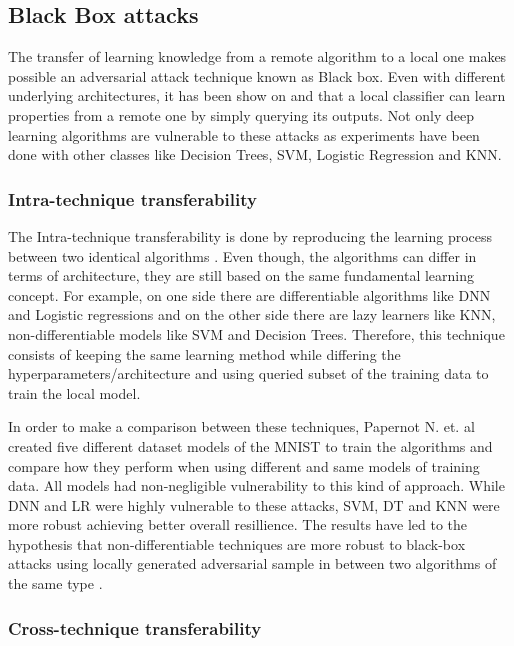 \documentclass{article}
\begin{document}
\subsection{Black Box attacks}\label{subsec:black_box}
 
The transfer of learning knowledge from a remote algorithm to a local one makes possible an adversarial attack technique known as Black box. Even with different underlying architectures, it has been show on \cite{papernot2016transf} and \cite{papernot2016} that a local classifier can learn properties from a remote one by simply querying its outputs. Not only deep learning algorithms are vulnerable to these attacks as experiments have been done with other classes like Decision Trees, SVM, Logistic Regression and KNN.


\subsubsection{Intra-technique transferability}\label{subsubsec:intra}

The Intra-technique transferability is done by reproducing the learning process between two identical algorithms \cite{papernot2016transf}. Even though, the algorithms can differ in terms of architecture, they are still based on the same fundamental learning concept. For example, on one side there are differentiable algorithms like DNN and Logistic regressions and on the other side there are lazy learners like KNN, non-differentiable models like SVM and Decision Trees. Therefore, this technique consists of keeping the same learning method while differing the hyperparameters/architecture and using queried subset of the training data to train the local model.

In order to make a comparison between these techniques, Papernot N. et. al \cite{papernot2016transf} created five different dataset models of the MNIST to train the algorithms and compare how they perform when using different and same models of training data. All models had non-negligible vulnerability to this kind of approach. While DNN and LR were highly vulnerable to these attacks, SVM, DT and KNN were more robust achieving better overall resillience. The results have led to the hypothesis that non-differentiable techniques are more robust to black-box attacks using locally generated adversarial sample in between two algorithms of the same type \cite{papernot2016}.

\subsubsection{Cross-technique transferability}\label{subsec:intra}
\end{document}
